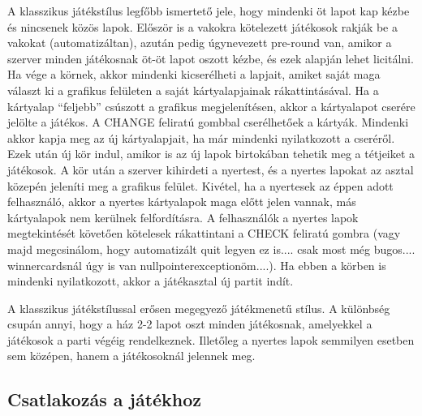 A klasszikus játékstílus legfőbb ismertető jele, hogy mindenki öt lapot kap kézbe és nincsenek közös lapok. Először is a vakokra kötelezett játékosok rakják be a vakokat (automatizáltan), azután pedig úgynevezett pre-round van, amikor a szerver minden játékosnak öt-öt lapot oszott kézbe, és ezek alapján lehet licitálni. Ha vége a körnek, akkor mindenki kicserélheti a lapjait, amiket saját maga választ ki a grafikus felületen a saját kártyalapjainak rákattintásával. Ha a kártyalap ``feljebb'' csúszott a grafikus megjelenítésen, akkor a kártyalapot cserére jelölte a játékos. A CHANGE feliratú gombbal cserélhetőek a kártyák. Mindenki akkor kapja meg az új kártyalapjait, ha már mindenki nyilatkozott a cseréről. Ezek után új kör indul, amikor is az új lapok birtokában tehetik meg a tétjeiket a játékosok. A kör után a szerver kihirdeti a nyertest, és a nyertes lapokat az asztal közepén jeleníti meg a grafikus felület. Kivétel, ha a nyertesek az éppen adott felhasználó, akkor a nyertes kártyalapok maga előtt jelen vannak, más kártyalapok nem kerülnek felfordításra. A felhasználók a nyertes lapok megtekintését követően kötelesek rákattintani a CHECK feliratú gombra (vagy majd megcsinálom, hogy automatizált quit legyen ez is.... csak most még bugos.... winnercardsnál úgy is van nullpointerexceptionöm....). Ha ebben a körben is mindenki nyilatkozott, akkor a játékasztal új partit indít.

A klasszikus játékstílussal erősen megegyező játékmenetű stílus. A különbség csupán annyi, hogy a ház 2-2 lapot oszt minden játékosnak, amelyekkel a játékosok a parti végéig rendelkeznek. Illetőleg a nyertes lapok semmilyen esetben sem középen, hanem a játékosoknál jelennek meg.

\subsection{Csatlakozás a játékhoz}

\clearpage